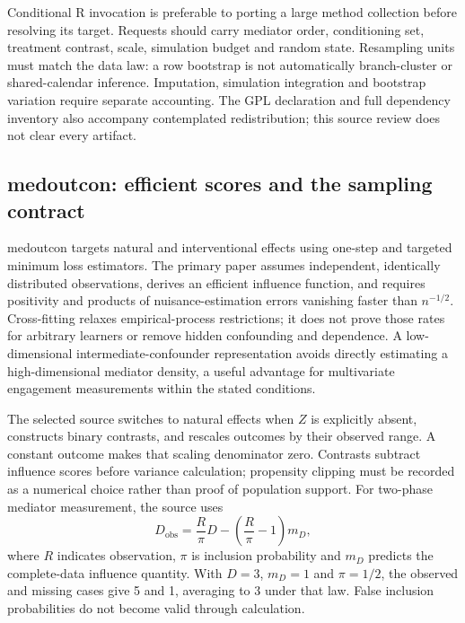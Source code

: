 Conditional R invocation is preferable to porting a large method collection
before resolving its target. Requests should carry mediator order, conditioning
set, treatment contrast, scale, simulation budget and random state. Resampling
units must match the data law: a row bootstrap is not automatically branch-cluster
or shared-calendar inference. Imputation, simulation integration and bootstrap
variation require separate accounting. The GPL declaration and full dependency
inventory also accompany contemplated redistribution; this source review does
not clear every artifact. \citep{exec25_rmed_cmaverse,exec25_rmed_choice}

\subsection{medoutcon: efficient scores and the sampling contract}

medoutcon targets natural and interventional effects using one-step and targeted
minimum loss estimators. The primary paper assumes independent, identically
distributed observations, derives an efficient influence function, and requires
positivity and products of nuisance-estimation errors vanishing faster than
$n^{-1/2}$. Cross-fitting relaxes empirical-process restrictions; it does not
prove those rates for arbitrary learners or remove hidden confounding and
dependence. A low-dimensional intermediate-confounder representation avoids
directly estimating a high-dimensional mediator density, a useful advantage
for multivariate engagement measurements within the stated conditions.
\citep{exec25_rmed_diaz_paper}

The selected source switches to natural effects when $Z$ is explicitly absent,
constructs binary contrasts, and rescales outcomes by their observed range.
A constant outcome makes that scaling denominator zero. Contrasts subtract
influence scores before variance calculation; propensity clipping must be
recorded as a numerical choice rather than proof of population support. For
two-phase mediator measurement, the source uses
\[
 D_{\mathrm{obs}}=\frac{R}{\pi}D
                 -\left(\frac{R}{\pi}-1\right)m_D,
\]
where $R$ indicates observation, $\pi$ is inclusion probability and $m_D$
predicts the complete-data influence quantity. With $D=3$, $m_D=1$ and
$\pi=1/2$, the observed and missing cases give 5 and 1, averaging to 3 under
that law. False inclusion probabilities do not become valid through calculation.
\citep{exec25_rmed_medoutcon,exec25_rmed_choice}

